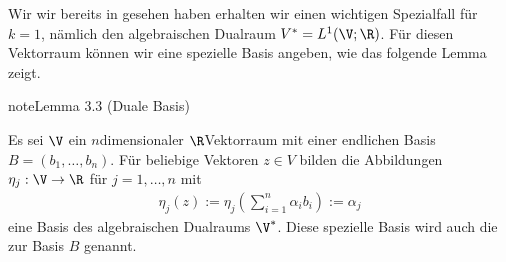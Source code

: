 \documentclass[letterpaper,10pt,german]{jupyterBook}
\begin{document}
\sphinxAtStartPar
Wir wir bereits in {\hyperref[\detokenize{vektoranalysis/multilinear:ex:multilinear}]{}} gesehen haben erhalten wir einen wichtigen Spezialfall für \(k=1\), nämlich den algebraischen Dualraum \(V^\ast = L^1(\V;\R)\).
Für diesen Vektorraum können wir eine spezielle Basis angeben, wie das folgende Lemma zeigt.
\label{vektoranalysis/multilinear:lem:dualeBasis}
\begin{sphinxadmonition}{note}{Lemma 3.3 (Duale Basis)}



\sphinxAtStartPar
Es sei \(\V\) ein \(n\)\sphinxhyphen{}dimensionaler \(\R\)\sphinxhyphen{}Vektorraum mit einer endlichen Basis \(B = (b_1,\ldots,b_n)\).
Für beliebige Vektoren \(z \in V\) bilden die Abbildungen \(\eta_j:\V\rightarrow\R\) für \(j=1,\ldots,n\) mit
\begin{equation*}
\begin{split}\eta_j(z) := \eta_j\left(\sum_{i=1}^n \alpha_i b_i\right) := \alpha_j\end{split}
\end{equation*}
\sphinxAtStartPar
eine Basis des algebraischen Dualraums \(\V^\ast\).
Diese spezielle Basis wird auch die  zur Basis \(B\) genannt.
\end{sphinxadmonition}
\end{document}
